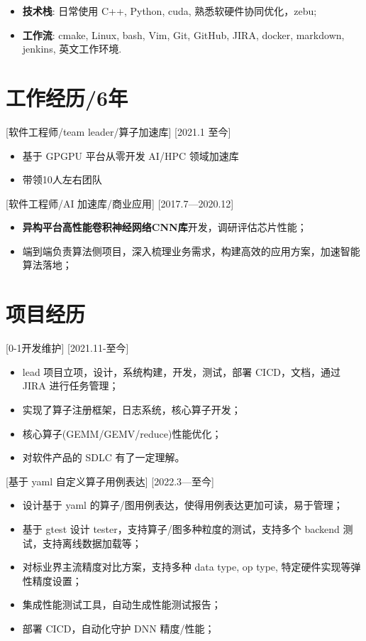 \documentclass{resume}
\begin{document}
\begin{itemize}
  \item \textbf{技术栈}: 日常使用 C++, Python, cuda, 熟悉软硬件协同优化，zebu;
  \item \textbf{工作流}: cmake, Linux, bash, Vim, Git, GitHub, JIRA, docker, markdown, jenkins, 英文工作环境.
\end{itemize}

\section{工作经历/6年}

[软件工程师/team leader/算子加速库]
[2021.1 至今]

\begin{itemize}
  \item 基于 GPGPU 平台从零开发 AI/HPC 领域加速库
  \item 带领10人左右团队
\end{itemize}

[软件工程师/AI 加速库/商业应用]
[2017.7—2020.12] 

\begin{itemize}
  \item \textbf{异构平台高性能卷积神经网络CNN库}开发，调研评估芯片性能；
  \item 端到端负责算法侧项目，深入梳理业务需求，构建高效的应用方案，加速智能算法落地；
\end{itemize}

\section{项目经历}

[0-1开发维护]
[2021.11-至今]
\begin{itemize}
  \item lead 项目立项，设计，系统构建，开发，测试，部署 CICD，文档，通过 JIRA 进行任务管理；
  \item 实现了算子注册框架，日志系统，核心算子开发；
  \item 核心算子(GEMM/GEMV/reduce)性能优化；
  \item 对软件产品的 SDLC 有了一定理解。
\end{itemize}


[基于 yaml 自定义算子用例表达]
[2022.3—至今]

\begin{itemize}
  \item 设计基于 yaml 的算子/图用例表达，使得用例表达更加可读，易于管理；
  \item 基于 gtest 设计 tester，支持算子/图多种粒度的测试，支持多个 backend 测试，支持离线数据加载等；
  \item 对标业界主流精度对比方案，支持多种 data type, op type, 特定硬件实现等弹性精度设置；
  \item 集成性能测试工具，自动生成性能测试报告；
  \item 部署 CICD，自动化守护 DNN 精度/性能；
\end{itemize}
\end{document}
